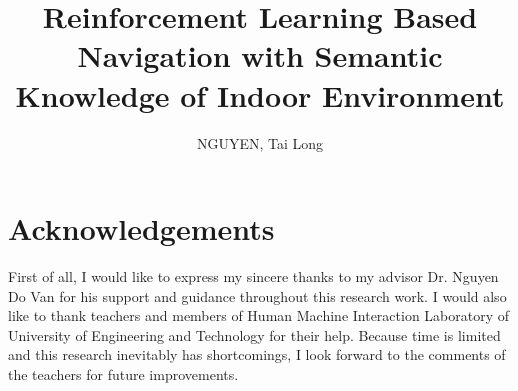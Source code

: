 \documentclass[12pt]{report}
\title{Reinforcement Learning Based Navigation with Semantic Knowledge of Indoor Environment}	%
\author{NGUYEN, Tai Long}			%
\begin{document}
%
\maketitle
\tableofcontents

%
\chapter*{Acknowledgements}

First of all, I would like to express my sincere thanks to my advisor Dr. Nguyen Do Van for his support and guidance throughout this research work. I would also like to thank teachers and members of Human Machine Interaction Laboratory of University of Engineering and Technology for their help. Because time is limited and this research inevitably has shortcomings, I look forward to the comments of the teachers for future improvements.

%
\listoffigures
\listoftables
%

\newpage\cleardoublepage
\newpage\cleardoublepage
\newpage\cleardoublepage
\newpage\cleardoublepage
\newpage\cleardoublepage


\printglossaries

\nocite{*}
\newpage\cleardoublepage

\end{document}
